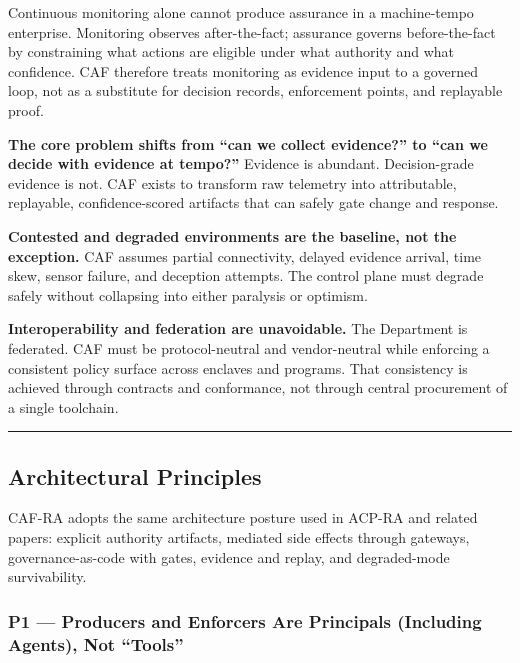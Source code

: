 \documentclass[11pt]{article}
\begin{document}
Continuous monitoring alone cannot produce assurance in a machine-tempo enterprise. Monitoring observes after-the-fact; assurance governs before-the-fact by constraining what actions are eligible under what authority and what confidence. CAF therefore treats monitoring as evidence input to a governed loop, not as a substitute for decision records, enforcement points, and replayable proof.

\textbf{The core problem shifts from ``can we collect evidence?'' to
``can we decide with evidence at tempo?''} Evidence is abundant.
Decision-grade evidence is not. CAF exists to transform raw telemetry
into attributable, replayable, confidence-scored artifacts that can
safely gate change and response.

\textbf{Contested and degraded environments are the baseline, not the
exception.} CAF assumes partial connectivity, delayed evidence arrival,
time skew, sensor failure, and deception attempts. The control plane
must degrade safely without collapsing into either paralysis or
optimism.

\textbf{Interoperability and federation are unavoidable.} The Department
is federated. CAF must be protocol-neutral and vendor-neutral while
enforcing a consistent policy surface across enclaves and programs. That
consistency is achieved through contracts and conformance, not through
central procurement of a single toolchain. \cite{DADMemo}

\begin{center}\rule{0.5\linewidth}{0.5pt}\end{center}

\hypertarget{architectural-principles}{%
\subsection{Architectural Principles}\label{architectural-principles}}

CAF-RA adopts the same architecture posture used in ACP-RA and related
papers: explicit authority artifacts, mediated side effects through
gateways, governance-as-code with gates, evidence and replay, and
degraded-mode survivability. \cite{ACPRA}

\hypertarget{p1-producers-and-enforcers-are-non-person-entities-not-tools}{%
\subsubsection{P1 --- Producers and Enforcers Are Principals (Including Agents), Not ``Tools''}\label{p1-producers-and-enforcers-are-non-person-entities-not-tools}}
\end{document}
